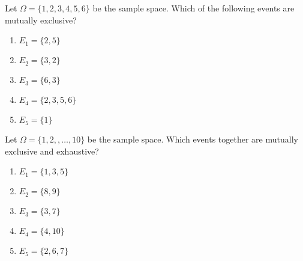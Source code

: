 \documentclass[../main.tex]{subfiles}
\begin{document}
%

\begin{example}
  Let \(\Omega = \{1,2,3,4,5,6\}\) be the sample space. Which of the following events are mutually exclusive?

  \begin{enumerate}[label=(\alph*)]
    \item \(E_{1} = \{2,5\}\)
    \item \(E_{2} = \{3,2\}\)
    \item \(E_{3} = \{6,3\}\)
    \item \(E_{4} = \{2,3,5,6\}\)
    \item \(E_{5} = \{1\}\)
  \end{enumerate}
\end{example}


\begin{example}
  Let \(\Omega = \{1,2,,\ldots,10\}\) be the sample space. Which events together are mutually exclusive and exhaustive?

  \begin{enumerate}[label=(\alph*)]
    \item \(E_{1} = \{1,3,5\}\)
    \item \(E_{2} = \{8,9\}\)
    \item \(E_{3} = \{3,7\}\)
    \item \(E_{4} = \{4,10\}\)
    \item \(E_{5} = \{2,6,7\}\)
  \end{enumerate}
\end{example}
\end{document}
